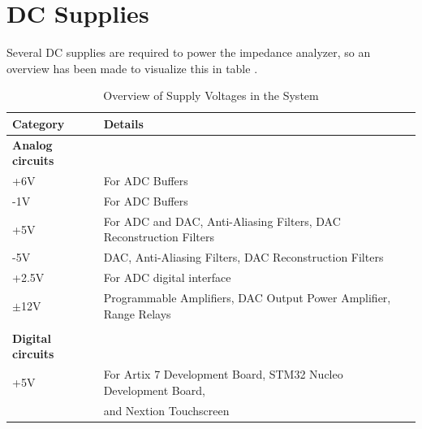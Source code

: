 \section{DC Supplies} \label{subsec:DCSupples}

Several DC supplies are required to power the impedance analyzer, so an overview has been made to visualize this in table .
\begin{table}[ht]
\centering
\begin{tabular}{@{}ll@{}}
\toprule
\textbf{Category}       & \textbf{Details}                                                                                 \\ \midrule
\textbf{Analog circuits} &                                                                                                 \\
\quad +6V                & For ADC Buffers                                                                                \\
\quad -1V                & For ADC Buffers                                                                                \\
\quad +5V                & For ADC and DAC, Anti-Aliasing Filters, DAC Reconstruction Filters                                                                                  \\
\quad -5V                & DAC, Anti-Aliasing Filters, DAC Reconstruction Filters  \\
\quad +2.5V              & For ADC digital interface                                                                      \\
\quad $\pm$12V           & Programmable Amplifiers, DAC Output Power Amplifier, Range Relays               \\
                         &                                                        \\ \midrule
\textbf{Digital circuits} &                                                                                                 \\
\quad +5V                & For Artix 7 Development Board, STM32 Nucleo Development Board,                                 \\
                         & and Nextion Touchscreen                                                                        \\ \bottomrule
\end{tabular}
\caption{Overview of Supply Voltages in the System}
\label{tab:7_1_6_Supply_Voltages}
\end{table}

